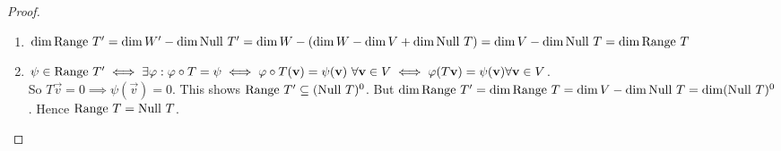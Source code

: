 \begin{proof} $ $
    \begin{enumerate}[label = (\alph*)]
        \item $\dim \text{Range } T' = \dim W' - \dim \text{Null } T' = \dim W - (\dim W - \dim V + \dim \text{Null } T) = \dim V - \dim \text{Null } T = \dim \text{Range } T$
        \item $\psi \in \text{Range } T' \iff \exists \varphi : \varphi \circ T = \psi \iff \varphi \circ T(\mathbf v) = \psi(\mathbf v) \ \forall \mathbf v \in V \iff \varphi(T\mathbf v) = \psi(\mathbf v) \forall \mathbf v \in V$. \\ So $T\vec v = 0 \implies \psi(\vec v) = 0$. This shows $\text{Range } T' \subseteq (\text{Null } T)^0$. But $\dim \text{Range } T' = \dim \text{Range } T = \dim V - \dim \text{Null } T = \dim (\text{Null } T)^0$. Hence $\text{Range } T = \text{Null } T$.
    \end{enumerate}
\end{proof}
